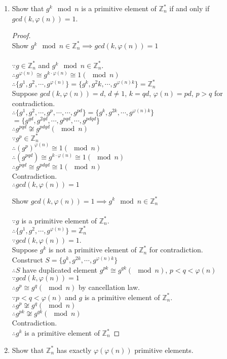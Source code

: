 \documentclass[paper=a4, fontsize=11pt]{scrartcl} %
\numberwithin{equation}{section} %
\numberwithin{figure}{section} %
\newcommand{\pnl}{$ $\newline\\}
\newcommand{\Z}{\mathbb{Z}}
\begin{document}
\begin{enumerate}
\item Show that $g^k \mod n$ is a primitive element of $\Z^*_n$ if and only if $gcd(k, \varphi(n)) = 1$.
\begin{proof}
\pnl
Show $g^k \mod n \in \Z^*_n \implies gcd(k, \varphi(n)) = 1$\\\\
$\because g \in \Z^*_n$ and $g^k \mod n \in \Z^*_n$.\\
$\therefore g^{\varphi(n)} \cong g^{k\cdot \varphi(n)}  \cong  1 (\mod n)$\\
$\therefore \{g^1, g^2, \cdots, g^{\varphi(n)}\} = \{g^k, g^2k, \cdots, g^{\varphi(n)k}\} = \Z^*_n$\\
Suppose $gcd(k, \varphi(n)) = d$, $d \neq 1$, $k=qd$, $\varphi(n)=pd$, $p>q$ for contradiction.\\
$\therefore \{g^1, g^2, \cdots, g^{p}, \cdots, \cdots, g^{pd}\} = \{g^k, g^{2k}, \cdots, g^{\varphi(n)k}\}$\\
$ = \{g^{qd}, g^{2qd}, \cdots, g^{pqd}, \cdots, g^{pdqd}\}$\\
$\therefore g^{pqd} \not \cong g^{pdqd} (\mod n)$\\
$\because g^{p} \in \Z^*_n$\\
$\therefore (g^{p})^{\varphi(n)} \cong 1 (\mod n)$\\
$\therefore (g^{pqd}) \cong g^{k\cdot \varphi(n)} \cong 1 (\mod n)$\\
$\therefore g^{pqd} \cong g^{pdqd} \cong 1 (\mod n)$\\
Contradiction.\\
$\therefore gcd(k, \varphi(n)) = 1$

Show $gcd(k, \varphi(n)) = 1 \implies g^k \mod n \in \Z^*_n$\\\\
$\because g$ is a primitive element of $\Z^*_n$.\\
$\therefore \{g^1, g^2, \cdots, g^{\varphi(n)}\} = \Z^*_n$\\
$\because gcd(k, \varphi(n)) = 1$.\\
Suppose $g^k$ is not a primitive element of $\Z^*_n$ for contradiction.\\
Construct $S = \{g^k, g^{2k}, \cdots, g^{\varphi(n)k}\}$\\
$\therefore S$ have duplicated element $g^{pk} \cong g^{qk} (\mod n)$, $p<q<\varphi(n)$\\
$\because gcd(k, \varphi(n)) = 1$\\
$\therefore g^{p} \cong g^{q} (\mod n)$ by cancellation law.\\
$\because p<q<\varphi(n)$ and $g$ is a primitive element of $\Z^*_n$.\\
$\therefore g^{p} \not \cong g^{q} (\mod n)$\\
$\therefore g^{pk} \not \cong g^{qk} (\mod n)$\\
Contradiction.\\
$\therefore g^k$ is a primitive element of $\Z^*_n$
\end{proof}
\item Show that $\Z^*_n$ has exactly $\varphi(\varphi(n))$ primitive elements.\\


\end{enumerate}
\end{document}
